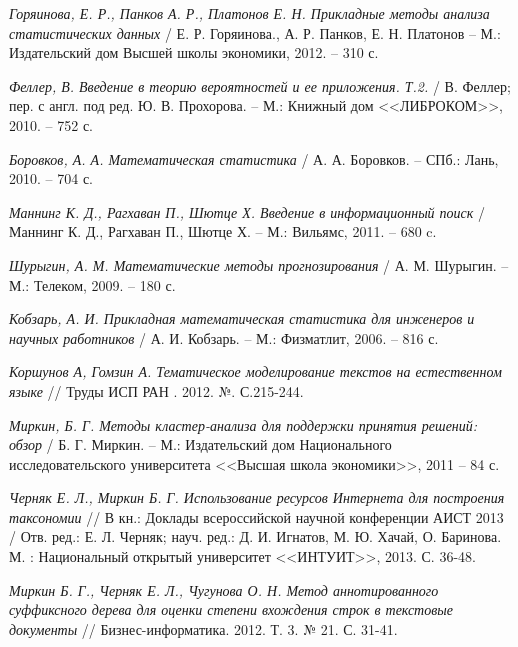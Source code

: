 \documentclass[12pt]{report}
\begin{document}
\renewcommand{\bibname}{Библиографический список использованной литературы}
\begin{thebibliography}{99}
\vspace{5mm}

{\it Горяинова, Е. Р., Панков А. Р., Платонов Е. Н. Прикладные методы анализа статистических данных} / Е. Р. Горяинова., А. Р. Панков, Е. Н. Платонов -- М.: Издательский дом Высшей школы экономики, 2012. -- 310 с.

{\it Феллер, В. Введение в теорию вероятностей и ее приложения. Т.2.} /
В. Феллер; пер. с англ. под ред. Ю. В. Прохорова. -- М.:
Книжный дом <<ЛИБРОКОМ>>, 2010. -- 752 с.

{\it Боровков, А. А. Математическая статистика} / А. А. Боровков. -- СПб.: Лань, 2010. -- 704 с.

{\it Маннинг К. Д., Рагхаван П., Шютце Х. Введение в информационный поиск} / Маннинг К. Д., Рагхаван П., Шютце Х. -- М.: Вильямс, 2011. -- 680 c.

{\it Шурыгин, А. М. Математические методы прогнозирования} / А. М. Шурыгин. -- М.: Телеком, 2009. -- 180 с.

{\it Кобзарь, А. И. Прикладная математическая статистика для инженеров и
  научных работников} / А. И. Кобзарь. -- М.: Физматлит, 2006. -- 816 с.

{\it Коршунов А, Гомзин А. Тематическое моделирование текстов на естественном языке} // Труды ИСП РАН . 2012. №. С.215-244.

{\it Миркин, Б. Г. Методы кластер-анализа для поддержки принятия решений: обзор} / Б. Г. Миркин. -- М.: Издательский дом Национального исследовательского университета <<Высшая школа экономики>>, 2011 -- 84 с.

{\it Черняк Е. Л., Миркин Б. Г. Использование ресурсов Интернета для построения таксономии} // В кн.: Доклады всероссийской научной конференции АИСТ 2013 / Отв. ред.: Е. Л. Черняк; науч. ред.: Д. И. Игнатов, М. Ю. Хачай, О. Баринова. М. : Национальный открытый университет <<ИНТУИТ>>, 2013. С. 36-48. 

{\it Миркин Б. Г., Черняк Е. Л., Чугунова О. Н. Метод аннотированного суффиксного дерева для оценки степени вхождения строк в текстовые документы }  // Бизнес-информатика. 2012. Т. 3. № 21. С. 31-41. 


\end{thebibliography}
\end{document}

